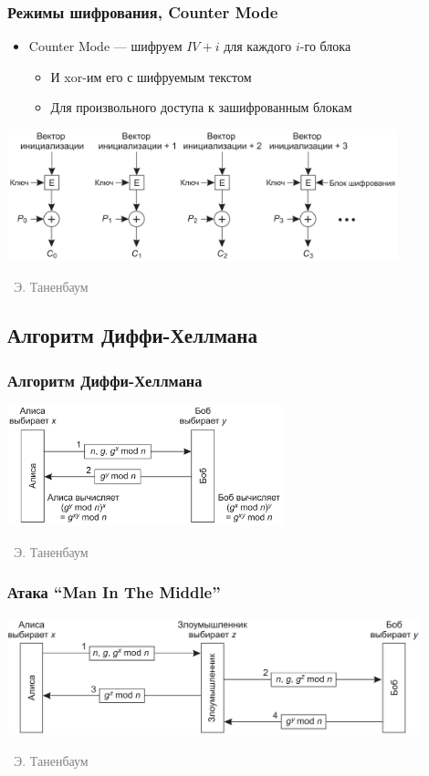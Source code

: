 \documentclass[xetex,mathserif,serif]{beamer}
\newcommand{\attribution}[1] {
\vspace{-5mm}\begin{flushright}\begin{scriptsize}\textcolor{gray}{\textcopyright\, #1}\end{scriptsize}\end{flushright}
}
\begin{document}
    \begin{frame}
        \frametitle{Режимы шифрования, Counter Mode}
        \begin{itemize}
            \item Counter Mode --- шифруем $IV + i$ для каждого $i$-го блока
            \begin{itemize}
                \item И xor-им его с шифруемым текстом
                \item Для произвольного доступа к зашифрованным блокам
            \end{itemize}
        \end{itemize}
        \begin{center}
            \includegraphics[width=0.85\textwidth]{cm.png}
            \attribution{Э. Таненбаум}
        \end{center}
    \end{frame}

    \subsection{Алгоритм Диффи-Хеллмана}

    \begin{frame}
        \frametitle{Алгоритм Диффи-Хеллмана}
        \begin{center}
            \includegraphics[width=0.6\textwidth]{diffieHellman.png}
            \attribution{Э. Таненбаум}
        \end{center}
    \end{frame}

    \begin{frame}
        \frametitle{Атака ``Man In The Middle''}
        \begin{center}
            \includegraphics[width=0.9\textwidth]{diffieHellmanMitm.png}
            \attribution{Э. Таненбаум}
        \end{center}
    \end{frame}
\end{document}
